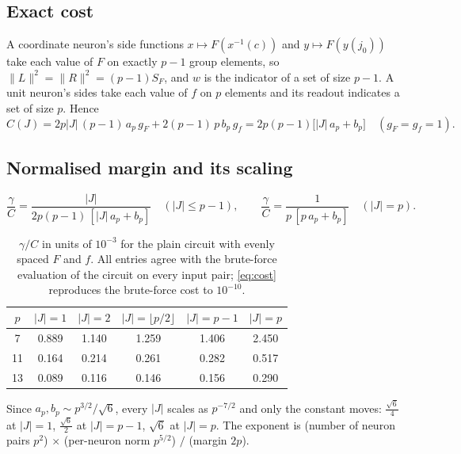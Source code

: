 \documentclass[11pt]{article}
\theoremstyle{remark}
\newcommand{\cost}{C}
\newcommand{\gam}{\gamma}
\newcommand{\abs}[1]{\lvert #1 \rvert}
\newcommand{\norm}[1]{\lVert #1 \rVert}
\begin{document}
\subsection{Exact cost}

A coordinate neuron's side functions $x \mapsto F(x^{-1}(c))$ and $y \mapsto F(y(j_0))$ take each value of $F$ on exactly $p-1$
group elements, so $\norm{L}^2 = \norm{R}^2 = (p-1) S_F$, and $w$ is the indicator of a set of size $p-1$. A unit neuron's sides take
each value of $f$ on $p$ elements and its readout indicates a set of size $p$. Hence
\begin{equation}\label{eq:cost}
\cost(J) = 2p\abs{J}\,(p-1)\,a_p\, g_F + 2(p-1)\, p\, b_p\, g_f = 2p(p-1)\bigl[\abs{J}\, a_p + b_p\bigr] \quad (g_F = g_f = 1).
\end{equation}

\subsection{Normalised margin and its scaling}

\begin{equation}\label{eq:plainratio}
\frac{\gam}{\cost} = \frac{\abs{J}}{2p(p-1)\,[\abs{J}\, a_p + b_p]} \quad (\abs{J} \le p-1), \qquad
\frac{\gam}{\cost} = \frac{1}{p\,[p\, a_p + b_p]} \quad (\abs{J} = p).
\end{equation}

\begin{table}[h]\centering
\begin{tabular}{c c c c c c}
\toprule
$p$ & $\abs{J}=1$ & $\abs{J}=2$ & $\abs{J}=\lfloor p/2 \rfloor$ & $\abs{J}=p-1$ & $\abs{J}=p$ \\
\midrule
7  & 0.889 & 1.140 & 1.259 & 1.406 & 2.450 \\
11 & 0.164 & 0.214 & 0.261 & 0.282 & 0.517 \\
13 & 0.089 & 0.116 & 0.146 & 0.156 & 0.290 \\
\bottomrule
\end{tabular}
\caption{$\gam/\cost$ in units of $10^{-3}$ for the plain circuit with evenly spaced $F$ and $f$. All entries agree with the
brute-force evaluation of the circuit on every input pair; \eqref{eq:cost} reproduces the brute-force cost to $10^{-10}$.}
\end{table}

Since $a_p, b_p \sim p^{3/2}/\sqrt{6}$, every $\abs{J}$ scales as $p^{-7/2}$ and only the constant moves:
$\tfrac{\sqrt{6}}{4}$ at $\abs{J} = 1$, $\tfrac{\sqrt{6}}{2}$ at $\abs{J} = p-1$, $\sqrt{6}$ at $\abs{J} = p$. The exponent is
(number of neuron pairs $p^2$) $\times$ (per-neuron norm $p^{5/2}$) $/$ (margin $2p$).
\end{document}
